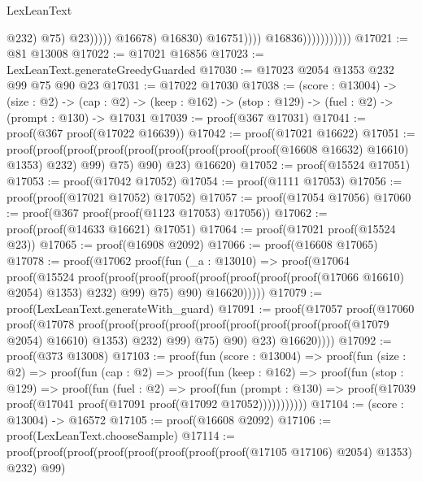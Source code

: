 \begin{lexlean}{LexLeanText}
\begin{coremodule}
                                                              @232)
                                                            @75)
                                                          @23)))))
                                          @16678)
                                        @16830)
                                      @16751))))
                            @16836)))))))))))
@17021 := @81 @13008
@17022 := @17021 @16856
@17023 := LexLeanText.generateGreedyGuarded
@17030 := @17023 @2054 @1353 @232 @99 @75 @90 @23
@17031 := @17022 @17030
@17038 := (score : @13004) ->
  (size : @2) ->
  (cap : @2) -> (keep : @162) -> (stop : @129) -> (fuel : @2) -> (prompt : @130) -> @17031
@17039 := proof(@367 @17031)
@17041 := proof(@367 proof(@17022 @16639))
@17042 := proof(@17021 @16622)
@17051 := proof(proof(proof(proof(proof(proof(proof(proof(proof(@16608 @16632) @16610) @1353) @232)
              @99)
            @75)
          @90)
        @23)
      @16620)
@17052 := proof(@15524 @17051)
@17053 := proof(@17042 @17052)
@17054 := proof(@1111 @17053)
@17056 := proof(proof(@17021 @17052) @17052)
@17057 := proof(@17054 @17056)
@17060 := proof(@367 proof(proof(@1123 @17053) @17056))
@17062 := proof(proof(@14633 @16621) @17051)
@17064 := proof(@17021 proof(@15524 @23))
@17065 := proof(@16908 @2092)
@17066 := proof(@16608 @17065)
@17078 := proof(@17062
      proof(fun (_a : @13010) =>
        proof(@17064
            proof(@15524
                proof(proof(proof(proof(proof(proof(proof(proof(@17066 @16610) @2054) @1353) @232)
                          @99)
                        @75)
                      @90)
                    @16620)))))
@17079 := proof(LexLeanText.generateWith_guard)
@17091 := proof(@17057
      proof(@17060
          proof(@17078
              proof(proof(proof(proof(proof(proof(proof(proof(proof(@17079 @2054) @16610) @1353)
                            @232)
                          @99)
                        @75)
                      @90)
                    @23)
                  @16620))))
@17092 := proof(@373 @13008)
@17103 := proof(fun (score : @13004) =>
    proof(fun (size : @2) =>
      proof(fun (cap : @2) =>
        proof(fun (keep : @162) =>
          proof(fun (stop : @129) =>
            proof(fun (fuel : @2) =>
              proof(fun (prompt : @130) =>
                proof(@17039 proof(@17041 proof(@17091 proof(@17092 @17052)))))))))))
@17104 := (score : @13004) -> @16572
@17105 := proof(@16608 @2092)
@17106 := proof(LexLeanText.chooseSample)
@17114 := proof(proof(proof(proof(proof(proof(proof(proof(@17105 @17106) @2054) @1353) @232) @99)

\end{coremodule}
\end{lexlean}
